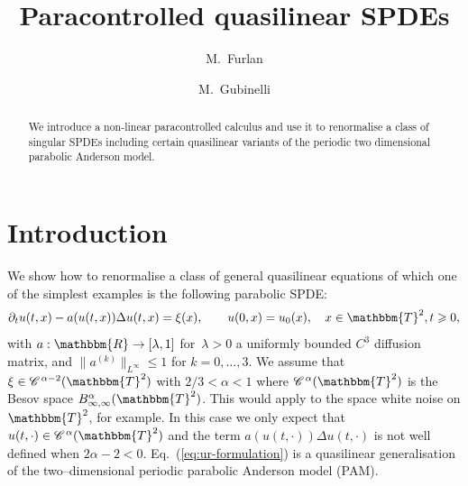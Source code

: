 \documentclass[11pt,reqno]{amsart}
\newcommand{\nospace}{}
\newcommand{\CC}{\mathscr{C} \hspace{.1em}}
\begin{document}
\title{Paracontrolled quasilinear SPDEs}

\author{M.~Furlan}
\address{CEREMADE\\
Universit{\'e} Paris Dauphine, France}

\author{ M.~Gubinelli}
\address{IAM \& HCM\\
Universit{\"a}t Bonn, Germany}

\begin{abstract}
  We introduce a non-linear paracontrolled calculus and use it to renormalise
  a class of singular SPDEs including certain quasilinear variants of the
  periodic two dimensional parabolic Anderson model.
\end{abstract}

{\maketitle}

\section{Introduction}

We show how to renormalise a class of general quasilinear equations of which
one of the simplest examples is the following parabolic SPDE:
\begin{equation}
  \partial_t u (t, x) - a (u (t, x)) \Delta u (t, x) = \xi (x), \qquad u (0,
  x) = u_0 (x), \quad x \in \mathbbm{T}^2, t \geqslant 0,
  \label{eq:ur-formulation}
\end{equation}
with $a : \mathbbm{R} \rightarrow [\lambda, 1]$ for~$\lambda > 0$ a uniformly
bounded $C^3$ diffusion matrix, and $\| a^{(k)} \|_{L^{\infty}} \leqslant 1$
for $k = 0, \ldots, 3$. We assume that $\xi \in \CC \nospace^{\alpha - 2}
(\mathbbm{T}^2)$ with $2 / 3 < \alpha < 1$ where $\CC^{\alpha}
(\mathbbm{T}^2)$ is the Besov space $B^{\alpha}_{\infty, \infty}
(\mathbbm{T}^2)$. This would apply to the space white noise on
$\mathbbm{T}^2$, for example. In this case we only expect that $u (t, \cdot)
\in \CC^{\alpha} (\mathbbm{T}^2)$ and the term $a (u (t, \cdot)) \Delta u (t,
\cdot)$ is not well defined when $2 \alpha - 2 < 0$.
Eq.~(\ref{eq:ur-formulation}) is a quasilinear generalisation of the
two--dimensional periodic parabolic Anderson model (PAM).
\end{document}
